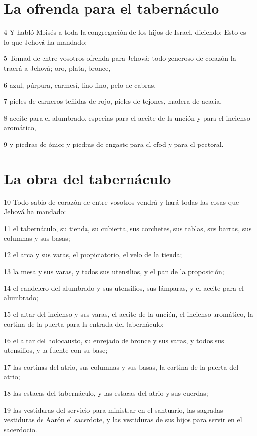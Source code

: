 \section*{La ofrenda para el tabernáculo}

\par 4 Y habló Moisés a toda la congregación de los hijos de Israel, diciendo: Esto es lo que Jehová ha mandado:
\par 5 Tomad de entre vosotros ofrenda para Jehová; todo generoso de corazón la traerá a Jehová; oro, plata, bronce,
\par 6 azul, púrpura, carmesí, lino fino, pelo de cabras,
\par 7 pieles de carneros teñidas de rojo, pieles de tejones, madera de acacia,
\par 8 aceite para el alumbrado, especias para el aceite de la unción y para el incienso aromático,
\par 9 y piedras de ónice y piedras de engaste para el efod y para el pectoral.

\section*{La obra del tabernáculo}

\par 10 Todo sabio de corazón de entre vosotros vendrá y hará todas las cosas que Jehová ha mandado:
\par 11 el tabernáculo, su tienda, su cubierta, sus corchetes, sus tablas, sus barras, sus columnas y sus basas;
\par 12 el arca y sus varas, el propiciatorio, el velo de la tienda;
\par 13 la mesa y sus varas, y todos sus utensilios, y el pan de la proposición;
\par 14 el candelero del alumbrado y sus utensilios, sus lámparas, y el aceite para el alumbrado;
\par 15 el altar del incienso y sus varas, el aceite de la unción, el incienso aromático, la cortina de la puerta para la entrada del tabernáculo;
\par 16 el altar del holocausto, su enrejado de bronce y sus varas, y todos sus utensilios, y la fuente con su base;
\par 17 las cortinas del atrio, sus columnas y sus basas, la cortina de la puerta del atrio;
\par 18 las estacas del tabernáculo, y las estacas del atrio y sus cuerdas;
\par 19 las vestiduras del servicio para ministrar en el santuario, las sagradas vestiduras de Aarón el sacerdote, y las vestiduras de sus hijos para servir en el sacerdocio.

